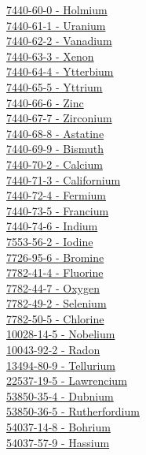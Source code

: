 \documentclass{book}
\begin{document}
\begin{multicols}{2}
\hyperref[sec:elem-holmium]{7440-60-0 - Holmium}\\
\hyperref[sec:elem-uranium]{7440-61-1 - Uranium}\\
\hyperref[sec:elem-vanadium]{7440-62-2 - Vanadium}\\
\hyperref[sec:elem-xenon]{7440-63-3 - Xenon}\\
\hyperref[sec:elem-ytterbium]{7440-64-4 - Ytterbium}\\
\hyperref[sec:elem-yttrium]{7440-65-5 - Yttrium}\\
\hyperref[sec:elem-zinc]{7440-66-6 - Zinc}\\
\hyperref[sec:elem-zirconium]{7440-67-7 - Zirconium}\\
\hyperref[sec:elem-astatine]{7440-68-8 - Astatine}\\
\hyperref[sec:elem-bismuth]{7440-69-9 - Bismuth}\\
\hyperref[sec:elem-calcium]{7440-70-2 - Calcium}\\
\hyperref[sec:elem-californium]{7440-71-3 - Californium}\\
\hyperref[sec:elem-fermium]{7440-72-4 - Fermium}\\
\hyperref[sec:elem-francium]{7440-73-5 - Francium}\\
\hyperref[sec:elem-indium]{7440-74-6 - Indium}\\
\hyperref[sec:elem-iodine]{7553-56-2 - Iodine}\\
\hyperref[sec:elem-bromine]{7726-95-6 - Bromine}\\
\hyperref[sec:elem-fluorine]{7782-41-4 - Fluorine}\\
\hyperref[sec:elem-oxygen]{7782-44-7 - Oxygen}\\
\hyperref[sec:elem-selenium]{7782-49-2 - Selenium}\\
\hyperref[sec:elem-chlorine]{7782-50-5 - Chlorine}\\
\hyperref[sec:elem-nobelium]{10028-14-5 - Nobelium}\\
\hyperref[sec:elem-radon]{10043-92-2 - Radon}\\
\hyperref[sec:elem-tellurium]{13494-80-9 - Tellurium}\\
\hyperref[sec:elem-lawrencium]{22537-19-5 - Lawrencium}\\
\hyperref[sec:elem-dubnium]{53850-35-4 - Dubnium}\\
\hyperref[sec:elem-rutherfordium]{53850-36-5 - Rutherfordium}\\
\hyperref[sec:elem-bohrium]{54037-14-8 - Bohrium}\\
\hyperref[sec:elem-hassium]{54037-57-9 - Hassium}\\

\end{multicols}
\end{document}
